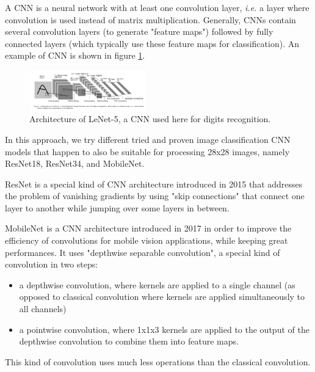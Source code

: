 \documentclass[10pt,twocolumn,letterpaper]{article}
\begin{document}
A CNN is a neural network with at least one convolution layer, \textit{i.e.} a layer where convolution is used instead of matrix multiplication. Generally, CNNs contain several convolution layers (to generate "feature maps") followed by fully connected layers (which typically use these feature maps for classification). An example of CNN is shown in figure \ref{fig:lenet5}.

\begin{figure}[h] 
\centering
\includegraphics[width=0.45\textwidth]{images/cnn_lenet5.png}
\caption{Architecture of LeNet-5, a CNN used here for digits recognition. \cite{lecun-98}}
\label{fig:lenet5}
\end{figure}

In this approach, we try different tried and proven image classification CNN models that happen to also be suitable for processing 28x28 images, namely ResNet18, ResNet34, and MobileNet.

ResNet is a special kind of CNN architecture introduced in 2015 \cite{he2016deep} that addresses the problem of vanishing gradients by using "skip connections" that connect one layer to another while jumping over some layers in between.

MobileNet is a CNN architecture introduced in 2017 \cite{howard2017mobilenets} in order to improve the efficiency of convolutions for mobile vision applications, while keeping great performances. It uses "depthwise separable convolution", a special kind of convolution in two steps:

\begin{itemize}
    \item a depthwise convolution, where kernels are applied to a single channel (as opposed to classical convolution where kernels are applied simultaneously to all channels)
    \item a pointwise convolution, where 1x1x3 kernels are applied to the output of the depthwise convolution to combine them into feature maps.
\end{itemize}

This kind of convolution uses much less operations than the classical convolution.

\subsection{\imgenTitle{}}
\end{document}

